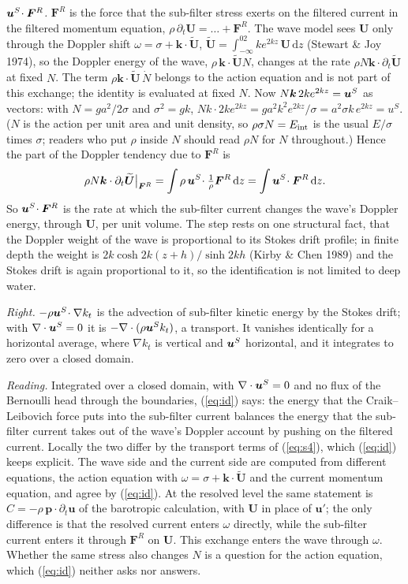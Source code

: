 \documentclass[10pt]{article}
\newcommand{\Ut}{\widetilde{\bm U}}
\newcommand{\bu}{\bm u}\newcommand{\bU}{\bm U}\newcommand{\bxi}{\bm\xi}\newcommand{\dd}{\mathrm d}
\begin{document}
\emph{$\bm u^S\!\cdot\bm F^R$.} $\bm F^R$ is the force that the sub-filter stress exerts on the filtered current in the filtered momentum equation, $\rho\,\partial_t\bU=\dots+\bm F^R$. The wave model sees $\bU$ only through the Doppler shift $\omega=\sigma+\bm k\cdot\Ut$, $\Ut=\int_{-\infty}^02ke^{2kz}\,\bU\,\dd z$ (Stewart \& Joy 1974), so the Doppler energy of the wave, $\rho\,\bm k\cdot\Ut N$, changes at the rate $\rho N\bm k\cdot\partial_t\Ut$ at fixed $N$. The term $\rho\bm k\cdot\Ut\,\dot N$ belongs to the action equation and is not part of this exchange; the identity is evaluated at fixed $N$. Now $N\bm k\,2ke^{2kz}=\bm u^S$ as vectors: with $N=ga^2/2\sigma$ and $\sigma^2=gk$, $Nk\cdot2ke^{2kz}=ga^2k^2e^{2kz}/\sigma=a^2\sigma k\,e^{2kz}=u^S$. ($N$ is the action per unit area and unit density, so $\rho\sigma N=E_{\rm int}$ is the usual $E/\sigma$ times $\sigma$; readers who put $\rho$ inside $N$ should read $\rho N$ for $N$ throughout.) Hence the part of the Doppler tendency due to $\bm F^R$ is
\[
\rho N\bm k\cdot\partial_t\Ut\big|_{\bm F^R}=\int\rho\,\uS\!\cdot\tfrac1\rho\bm F^R\,\dd z=\int\uS\!\cdot\bm F^R\,\dd z .
\]
So $\bm u^S\!\cdot\bm F^R$ is the rate at which the sub-filter current changes the wave's Doppler energy, through $\bU$, per unit volume. The step rests on one structural fact, that the Doppler weight of the wave is proportional to its Stokes drift profile; in finite depth the weight is $2k\cosh2k(z+h)/\sinh2kh$ (Kirby \& Chen 1989) and the Stokes drift is again proportional to it, so the identification is not limited to deep water.

\emph{Right.} $-\rho\bm u^S\!\cdot\nabla k_t$ is the advection of sub-filter kinetic energy by the Stokes drift; with $\nabla\cdot\bm u^S=0$ it is $-\nabla\cdot(\rho\bm u^S k_t)$, a transport. It vanishes identically for a horizontal average, where $\nabla k_t$ is vertical and $\bm u^S$ horizontal, and it integrates to zero over a closed domain.

\emph{Reading.} Integrated over a closed domain, with $\nabla\cdot\bm u^S=0$ and no flux of the Bernoulli head through the boundaries, (\ref{eq:id}) says: the energy that the Craik--Leibovich force puts into the sub-filter current balances the energy that the sub-filter current takes out of the wave's Doppler account by pushing on the filtered current. Locally the two differ by the transport terms of (\ref{eq:s4}), which (\ref{eq:id}) keeps explicit. The wave side and the current side are computed from different equations, the action equation with $\omega=\sigma+\bm k\cdot\Ut$ and the current momentum equation, and agree by (\ref{eq:id}). At the resolved level the same statement is $C=-\rho\,\bm p\cdot\partial_t\bu$ of the barotropic calculation, with $\bU$ in place of $\bu'$; the only difference is that the resolved current enters $\omega$ directly, while the sub-filter current enters it through $\bm F^R$ on $\bU$. This exchange enters the wave through $\omega$. Whether the same stress also changes $N$ is a question for the action equation, which (\ref{eq:id}) neither asks nor answers.
\end{document}
